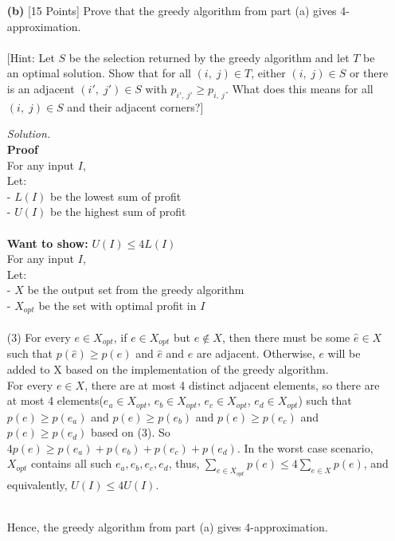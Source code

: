 \documentclass[10pt]{article}
\begin{document}
\begin{enumerate}
\begin{mdframed}
    \end{mdframed}
    \item[\textbf{(b)}] {[15 Points]} Prove that the greedy algorithm from part (a) gives 4-approximation.\\
    \\
    {[Hint: Let $S$ be the selection returned by the greedy algorithm and
    let $T$ be an optimal solution. Show that for all $(i, \; j) \in T$, either $(i, \; j) \in S$ or there is an adjacent $(i', \; j') \in S$ with $p_{i', \: j'} \geq p_{i, \: j}$. What does this means for all $(i, \; j) \in S$ and their adjacent corners?]}
    \begin{mdframed}
        \textit{Solution.}\\ %
        \textbf{Proof}
        \\For any input $I$,
        \\Let:
        \\- $L(I)$ be the lowest sum of profit
        \\- $U(I)$ be the highest sum of profit
        \\
        \\\textbf{Want to show:} $U(I) \leq 4L(I)$
        \\For any input $I$,
        \\Let:
        \\- $X$ be the output set from the greedy algorithm
        \\- $X_{opt}$ be the set with optimal profit in $I$
        \\
        \\(3) For every $e \in X_{opt}$, if $e \in X_{opt}$ but $e \notin X$, then there must be some $\hat{e} \in X$ such that $p(\hat{e}) \geq p(e)$ and $\hat{e}$ and $e$ are adjacent. Otherwise, $e$ will be added to X based on the implementation of the greedy algorithm.
        \\For every $e \in X$, there are at most 4 distinct adjacent elements, so there are at most 4 elements($e_a \in X_{opt}$, $e_b \in X_{opt}$, $e_c \in X_{opt}$, $e_d \in X_{opt}$) such that $p(e) \geq p(e_a)$ and $p(e) \geq p(e_b)$ and $p(e) \geq p(e_c)$ and $p(e) \geq p(e_d)$ based on (3). So $4p(e) \geq p(e_a)+p(e_b)+p(e_c)+p(e_d)$. In the worst case scenario, $X_{opt}$ contains all such $e_a, e_b, e_c, e_d$, thus, $\sum_{e \in X_{opt}}p(e) \leq 4\sum_{e \in X}p(e)$, and equivalently, $U(I) \leq 4U(I)$.
        
        \\Hence, the greedy algorithm from part (a) gives 4-approximation.
        
    \end{mdframed}
\end{enumerate}
\end{document}
